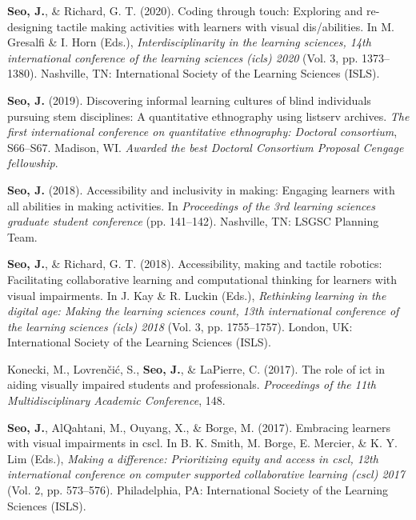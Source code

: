 \documentclass[11pt, a4paper]{awesome-cv}
\begin{document}
\hypertarget{refs_proceedings}{}
\leavevmode\hypertarget{ref-seo2020coding}{}%
\textbf{Seo, J.}, \& Richard, G. T. (2020). Coding through touch:
Exploring and re-designing tactile making activities with learners with
visual dis/abilities. In M. Gresalfi \& I. Horn (Eds.),
\emph{Interdisciplinarity in the learning sciences, 14th international
conference of the learning sciences (icls) 2020} (Vol. 3, pp.
1373--1380). Nashville, TN: International Society of the Learning
Sciences (ISLS).

\leavevmode\hypertarget{ref-seo2019discovering}{}%
\textbf{Seo, J.} (2019). Discovering informal learning cultures of blind
individuals pursuing stem disciplines: A quantitative ethnography using
listserv archives. \emph{The first international conference on
quantitative ethnography: Doctoral consortium}, S66--S67. Madison, WI.
\emph{Awarded the best Doctoral Consortium Proposal Cengage fellowship}.

\leavevmode\hypertarget{ref-seo2018making}{}%
\textbf{Seo, J.} (2018). Accessibility and inclusivity in making:
Engaging learners with all abilities in making activities. In
\emph{Proceedings of the 3rd learning sciences graduate student
conference} (pp. 141--142). Nashville, TN: LSGSC Planning Team.

\leavevmode\hypertarget{ref-seo2018accessibility}{}%
\textbf{Seo, J.}, \& Richard, G. T. (2018). Accessibility, making and
tactile robotics: Facilitating collaborative learning and computational
thinking for learners with visual impairments. In J. Kay \& R. Luckin
(Eds.), \emph{Rethinking learning in the digital age: Making the
learning sciences count, 13th international conference of the learning
sciences (icls) 2018} (Vol. 3, pp. 1755--1757). London, UK:
International Society of the Learning Sciences (ISLS).

\leavevmode\hypertarget{ref-konecki2017role}{}%
Konecki, M., Lovrenčić, S., \textbf{Seo, J.}, \& LaPierre, C. (2017).
The role of ict in aiding visually impaired students and professionals.
\emph{Proceedings of the 11th Multidisciplinary Academic Conference},
148.

\leavevmode\hypertarget{ref-seo2017embracing}{}%
\textbf{Seo, J.}, AlQahtani, M., Ouyang, X., \& Borge, M. (2017).
Embracing learners with visual impairments in cscl. In B. K. Smith, M.
Borge, E. Mercier, \& K. Y. Lim (Eds.), \emph{Making a difference:
Prioritizing equity and access in cscl, 12th international conference on
computer supported collaborative learning (cscl) 2017} (Vol. 2, pp.
573--576). Philadelphia, PA: International Society of the Learning
Sciences (ISLS).
\end{document}
